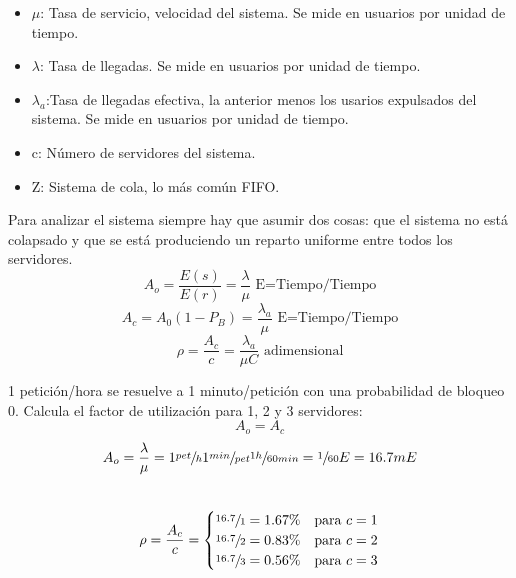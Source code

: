 \begin{itemize}
	\item $\mu$: Tasa de servicio, velocidad del sistema. Se mide en usuarios por unidad de tiempo.\\
	\item $\lambda$: Tasa de llegadas. Se mide en usuarios por unidad de tiempo.\\
	\item $\lambda_a$:Tasa de llegadas efectiva, la anterior menos los usarios expulsados del sistema. Se mide en usuarios por unidad de tiempo.\\
	\item c: Número de servidores del sistema.\\
	\item Z: Sistema de cola, lo más común FIFO.\\
\end{itemize}
Para analizar el sistema siempre hay que asumir dos cosas: que el sistema no está colapsado y que se está produciendo un reparto uniforme entre todos los servidores.\\
\begin{equation}%
A_o=\frac{E(s)}{E(r)}=\frac{\lambda}{\mu}\text{ E=Tiempo/Tiempo}
\end{equation}
\begin{equation}%
A_c=A_0(1-P_B)=\frac{\lambda_a}{\mu}\text{ E=Tiempo/Tiempo}
\end{equation}
\begin{equation}%
\rho=\frac{A_c}{c}=\frac{\lambda_a}{\mu C}\text{ adimensional}
\end{equation}
\begin{example}
1 petición/hora se resuelve a 1 minuto/petición con una probabilidad de bloqueo 0. Calcula el factor de utilización para 1, 2 y 3 servidores:\\
\[A_o=A_c\]
\[A_o=\frac{\lambda}{\mu}=1\sfrac{pet}{h}1\sfrac{min}{pet}\sfrac{1h}{60min}=\sfrac{1}{60}E=16.7mE\]\\
\[\rho=\frac{A_c}{c}=
\begin{cases}
\sfrac{16.7}{1}=1.67\% & \text{para } c=1\\
\sfrac{16.7}{2}=0.83\% & \text{para } c=2\\
\sfrac{16.7}{3}=0.56\% & \text{para } c=3
\end{cases}\]
\end{example}


